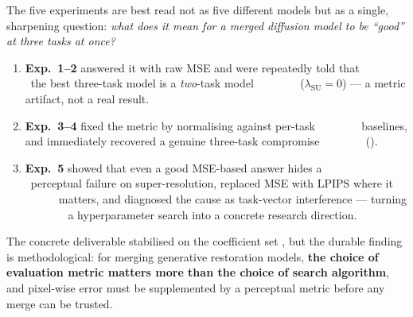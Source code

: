The five experiments are best read not as five different models but as a single,
sharpening question: \emph{what does it mean for a merged diffusion model to be
``good'' at three tasks at once?}

\begin{enumerate}[nosep,leftmargin=1.6em]
   \item \textbf{Exp.~1--2} answered it with raw MSE and were repeatedly told that
         the best three-task model is a \emph{two}-task model
         ($\lambda_{\mathrm{SU}}=0$) --- a metric artifact, not a real result.
   \item \textbf{Exp.~3--4} fixed the metric by normalising against per-task
         baselines, and immediately recovered a genuine three-task compromise
         ().
   \item \textbf{Exp.~5} showed that even a good MSE-based answer hides a
         perceptual failure on super-resolution, replaced MSE with LPIPS where it
         matters, and diagnosed the cause as task-vector interference --- turning
         a hyperparameter search into a concrete research direction.
\end{enumerate}

The concrete deliverable stabilised on the coefficient set
\textbf{}, but the durable finding is methodological: for
merging generative restoration models, \textbf{the choice of evaluation metric
matters more than the choice of search algorithm}, and pixel-wise error must be
supplemented by a perceptual metric before any merge can be trusted.



